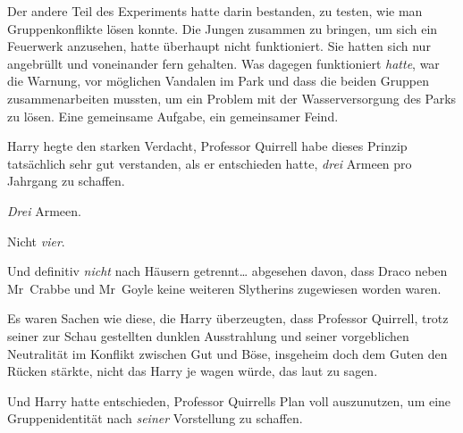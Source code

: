 Der andere Teil des Experiments hatte darin bestanden, zu testen, wie man Gruppenkonflikte lösen konnte. Die Jungen zusammen zu bringen, um sich ein Feuerwerk anzusehen, hatte überhaupt nicht funktioniert. Sie hatten sich nur angebrüllt und voneinander fern gehalten. Was dagegen funktioniert \emph{hatte}, war die Warnung, vor möglichen Vandalen im Park und dass die beiden Gruppen zusammenarbeiten mussten, um ein Problem mit der Wasserversorgung des Parks zu lösen. Eine gemeinsame Aufgabe, ein gemeinsamer Feind.

Harry hegte den starken Verdacht, Professor Quirrell habe dieses Prinzip tatsächlich sehr gut verstanden, als er entschieden hatte, \emph{drei} Armeen pro Jahrgang zu schaffen.

\emph{Drei} Armeen.

Nicht \emph{vier}.

Und definitiv \emph{nicht} nach Häusern getrennt… abgesehen davon, dass Draco neben Mr~Crabbe und Mr~Goyle keine weiteren Slytherins zugewiesen worden waren.

Es waren Sachen wie diese, die Harry überzeugten, dass Professor Quirrell, trotz seiner zur Schau gestellten dunklen Ausstrahlung und seiner vorgeblichen Neutralität im Konflikt zwischen Gut und Böse, insgeheim doch dem Guten den Rücken stärkte, nicht das Harry je wagen würde, das laut zu sagen.

Und Harry hatte entschieden, Professor Quirrells Plan voll auszunutzen, um eine Gruppenidentität nach \emph{seiner} Vorstellung zu schaffen.

